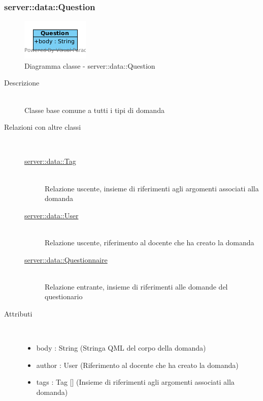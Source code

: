 \subsubsection[Question]{server::data::Question}
\begin{center}
			\begin{figure}[H]
				\centering \includegraphics[scale=4, max width=\textwidth, max height=\myheight]{../img/diagrammiClassi/server/data/Question.png}
				\caption{Diagramma classe - server::data::Question}
			\end{figure}
		\end{center}\begin{description}
\item[Descrizione] \hfill \\
 Classe base comune a tutti i tipi di domanda
\item[Relazioni con altre classi] \hfill \\
 \vspace{-7mm}
\begin{description}
\item[\hyperlink{server::data::Tag}{server::data::Tag}] \hfill \\
 Relazione uscente, insieme di riferimenti agli argomenti associati alla domanda
\item[\hyperlink{server::data::User}{server::data::User}] \hfill \\
 Relazione uscente, riferimento al docente che ha creato la domanda
\item[\hyperlink{server::data::Questionnaire}{server::data::Questionnaire}] \hfill \\
 Relazione entrante, insieme di riferimenti alle domande del questionario
\end{description}

\item[Attributi] \hfill \\
 \vspace{-7mm}
\begin{itemize}
\item body : String (Stringa QML del corpo della domanda)
\item author : User (Riferimento al docente che ha creato la domanda)
\item tags : Tag [] (Insieme di riferimenti agli argomenti associati alla domanda)
\end{itemize}

\end{description}

